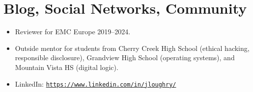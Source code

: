 \section*{Blog, Social Networks, Community}
\vspace{-3mm}

\begin{itemize}
    \item Reviewer for EMC Europe 2019--2024.\vspace{-3mm}
    \item Outside mentor for students from Cherry Creek High School
        (ethical hacking, responsible disclosure), Grandview High School
        (operating systems), and Mountain Vista HS (digital logic).\vspace{-3mm}
    \item LinkedIn:
        \href{https://www.linkedin.com/in/jloughry/}{\nolinkurl{https://www.linkedin.com/in/jloughry/}}
\end{itemize}


